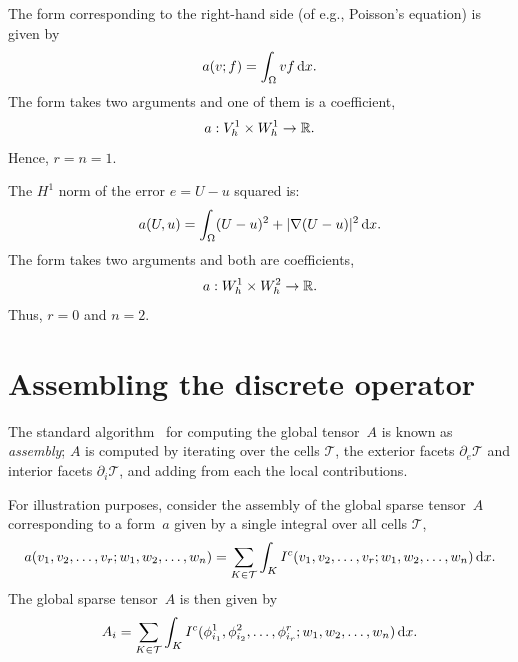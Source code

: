 \begin{example}
\label{example:rhs}
The form corresponding to the right-hand side (of e.g., Poisson's equation)
is given by
\begin{equation}
a(v; f) = \int_{\Omega} v f \, \mathrm{d}x.
\end{equation}
The form takes two arguments and one of them is a coefficient,
\begin{equation}
a : V_h^1 \times  W_h^1 \rightarrow \mathbb{R}.
\end{equation}
Hence, $r = n = 1$.
\end{example}

\begin{example}
The $H^1$ norm of the error $e = U - u$ squared is: 
\begin{equation}
a(U, u) = \int_{\Omega} (U - u)^2 + |\nabla (U - u)|^2 \, \mathrm{d}x.
\end{equation}
The form takes two arguments and both are coefficients,
\begin{equation}
a : W_h^1 \times  W_h^2 \rightarrow \mathbb{R}.
\end{equation}
Thus, $r=0$ and $n=2$. 
\end{example}

\section{Assembling the discrete operator}

The standard algorithm~\cite{ZieTay67,Hug87,Lan99} for computing the
global tensor~$A$ is known as \emph{assembly}; $A$ is computed by
iterating over the cells $\mathcal{T}$, the exterior facets
$\partial_e\mathcal{T}$ and interior facets $\partial_i\mathcal{T}$,
and adding from each the local contributions.

For illustration purposes, consider the assembly of the global sparse
tensor~$A$ corresponding to a form~$a$ given by a single integral over
all cells $\mathcal{T}$,
\begin{equation}
  a(v_1, v_2, \ldots, v_r; w_1, w_2, \ldots, w_n) =
  \sum_{K\in\mathcal{T}} \int_K
  I^c(v_1, v_2, \ldots, v_r; w_1, w_2, \ldots, w_n) \, \mathrm{d}x.
\end{equation}
The global sparse tensor~$A$ is then given by
\begin{equation}
  A_i = \sum_{K\in\mathcal{T}} \int_K
  I^c(\phi^1_{i_1}, \phi^2_{i_2}, \ldots, \phi^r_{i_r}; w_1, w_2, \ldots, w_n) \, \mathrm{d}x.
\end{equation}

